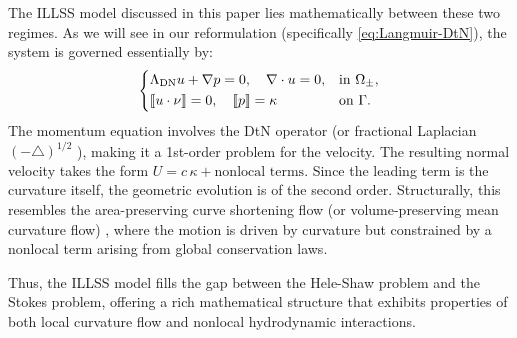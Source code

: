 \documentclass{article}
\theoremstyle{remark}
\theoremstyle{definition}
\numberwithin{equation}{section}
\begin{document}
The ILLSS model discussed in this paper lies mathematically between these two regimes. As we will see in our reformulation (specifically \eqref{eq:Langmuir-DtN}), the system is governed essentially by:
\begin{equation*}
    \begin{dcases*}
        \Lambda_{\mathrm{DN}} u + \nabla p = 0, \quad \nabla \cdot u = 0,&in $\Omega_\pm$,\\
        \llbracket u \cdot \nu \rrbracket = 0,\quad\llbracket p \rrbracket = \kappa&on $\Gamma$.
    \end{dcases*}
\end{equation*}
The momentum equation involves the DtN operator (or fractional Laplacian $(-\triangle)^{1/2}$ \cite{caffarelli2007extension}), making it a 1st-order problem for the velocity. The resulting normal velocity takes the form $U = c\,\kappa + \text{nonlocal terms}$. Since the leading term is the curvature itself, the geometric evolution is of the second order. Structurally, this resembles the area-preserving curve shortening flow (or volume-preserving mean curvature flow) \cite{gage1986area, huisken1987volume, escher1998volume}, where the motion is driven by curvature but constrained by a nonlocal term arising from global conservation laws.

Thus, the ILLSS model fills the gap between the Hele-Shaw problem and the Stokes problem, offering a rich mathematical structure that exhibits properties of both local curvature flow and nonlocal hydrodynamic interactions.
\end{document}

